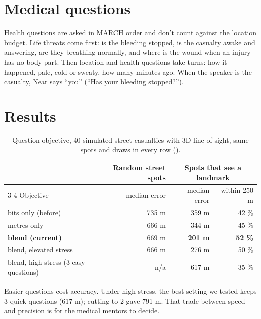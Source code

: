 \section{Medical questions}

Health questions are asked in MARCH order and don't count against the location budget. Life threats come
first: is the bleeding stopped, is the casualty awake and answering, are they breathing normally, and where
is the wound when an injury has no body part. Then location and health questions take turns: how it
happened, pale, cold or sweaty, how many minutes ago. When the speaker is the casualty, Near says ``you''
(``Has your bleeding stopped?'').

\section{Results}

\begin{table}[htbp]\centering\small
\caption{Question objective, 40 simulated street casualties with 3D line of sight, same spots and draws in every row
().}\label{tab:qobj}
\begin{tabular}{lrrr}
\toprule
& Random street spots & \multicolumn{2}{c}{Spots that see a landmark}\\
\cmidrule(lr){3-4}
Objective & median error & median error & within 250 m\\
\midrule
bits only (before) & 735 m & 359 m & 42 \%\\
metres only & 666 m & 344 m & 45 \%\\
\textbf{blend (current)} & 669 m & \textbf{201 m} & \textbf{52 \%}\\
blend, elevated stress & 666 m & 276 m & 50 \%\\
blend, high stress (3 easy questions) & n/a & 617 m & 35 \%\\
\bottomrule
\end{tabular}
\end{table}

Easier questions cost accuracy. Under high stress, the best setting we tested keeps 3 quick questions (617 m);
cutting to 2 gave 791 m. That trade between speed and precision is for the medical mentors to decide.
